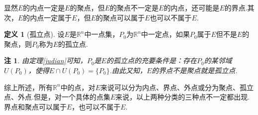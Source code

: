 \documentclass[lang=cn,12pt]{ctexart}
\theoremstyle{definition}
\newtheorem{definition}{定义}
\theoremstyle{plain}
\newtheorem*{remark}{注}
\begin{document}
显然$E$的内点一定是$E$的聚点，但$E$的聚点不一定是$E$的内点，还可能是$E$的界点.其次，$E$的内点一定属于$E$，但$E$的聚点可以属于$E$也可以不属于$E$.
\begin{definition}[孤立点]
	设$E$是$\mathbb{R}^n$中一点集，$P_0$为$\mathbb{R}^n$中一定点，如果$P_0$属于$E$但不是$E$的聚点，则$P_0$称为$E$的{\heiti 孤立点}.
\end{definition}
\begin{remark}
	由定理\ref{judian}可知，$P_0$是$E$的孤立点的充要条件是：存在$P_0$的某邻域$U(P_0)$，使得$E\cap U(P_0)=\{P_0\}$.由此又知，{\heiti $E$的界点不是聚点就是孤立点}.
\end{remark}
综上所述，所有$\mathbb{R}^n$中的点，对$E$来说可以分为内点、界点、外点或分为聚点、孤立点、外点.但是，对一个具体的点集$E$来说，以上两种分类的三种点不一定都出现.界点和聚点可以属于$E$，也可以不属于$E$.
\end{document}
